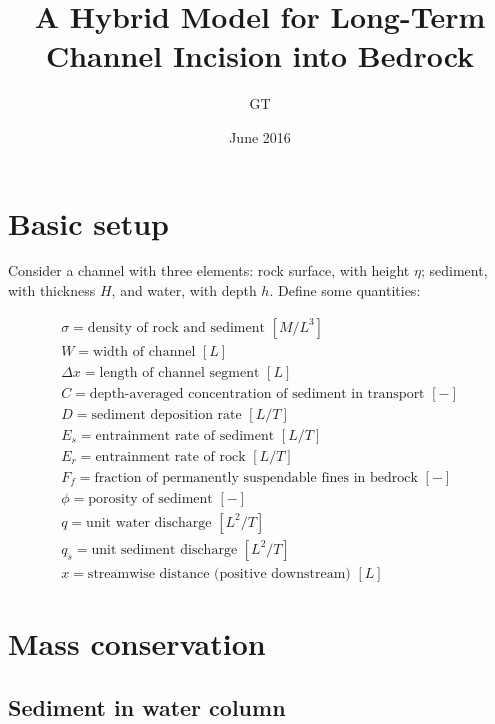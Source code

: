\documentclass[12pt]{amsart}
\title{A Hybrid Model for Long-Term Channel Incision into Bedrock}
\author{GT}
\date{June 2016} %
\begin{document}
\maketitle

\section{Basic setup}

Consider a channel with three elements: rock surface, with height $\eta$; sediment, with thickness $H$, and water, with depth $h$. Define some quantities:

\begin{eqnarray*}
\sigma = \text{density of rock and sediment } [M/L^3] \\
W = \text{width of channel } [L] \\
\Delta x = \text{length of channel segment } [L] \\
C = \text{depth-averaged concentration of sediment in transport } [-] \\
D = \text{sediment deposition rate } [L/T] \\
E_s = \text{entrainment rate of sediment } [L/T] \\
E_r = \text{entrainment rate of rock } [L/T] \\
F_f = \text{fraction of permanently suspendable fines in bedrock } [-] \\
\phi = \text{porosity of sediment } [-] \\
q = \text{unit water discharge } [L^2/T] \\
q_s = \text{unit sediment discharge } [L^2/T] \\
x = \text{streamwise distance (positive downstream) } [L]
\end{eqnarray*}

\section{Mass conservation}

\subsection{Sediment in water column}
\end{document}
